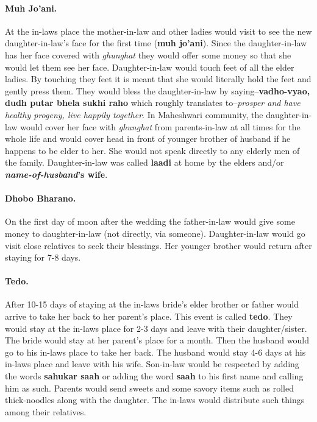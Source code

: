 \paragraph{Muh Jo'ani.} At the in-laws place the mother-in-law and other ladies
would visit to see the new daughter-in-law's face for the first time
(\textbf{muh jo'ani}). Since the daughter-in-law has her face covered with
\textit{ghunghat} they would offer some money so that she would let them see
her face. Daughter-in-law would touch feet of all the elder ladies. By touching
they feet it is meant that she would literally hold the feet and gently press
them. They would bless the daughter-in-law by saying--\textbf{vadho-vyao, dudh
putar bhela sukhi raho} which roughly translates to--\textit{prosper and
have healthy progeny, live happily together}. In Maheshwari community,
the daughter-in-law would cover her face with \textit{ghunghat} from
parents-in-law at all times for the whole life and would cover head in
front of younger brother of husband if he happens to be elder to her.
She would not speak directly to any elderly men of the family.
Daughter-in-law was called \textbf{laadi} at home by the elders and/or
\textbf{\emph{name-of-husband}'s wife}. 

\paragraph{Dhobo Bharano.} On the first day of moon after the wedding the
father-in-law would give some money to daughter-in-law (not directly, via
someone). Daughter-in-law would go visit close relatives to seek their
blessings. Her younger brother would return after staying for 7-8 days.

\paragraph{Tedo.} After 10-15 days of staying at the in-laws bride's elder
brother or father would arrive to take her back to her parent's place. This
event is called \textbf{tedo}. They would stay at the in-laws place for 2-3
days and leave with their daughter/sister. The bride would stay at her parent's
place for a month. Then the husband would go to his in-laws place to take her
back. The husband would stay 4-6 days at his in-laws place and leave with his
wife. Son-in-law would be respected by adding the words \textbf{sahukar saah}
or adding the word \textbf{saah} to his first name and calling him as such.
Parents would send sweets and some savory items such as rolled thick-noodles
along with the daughter. The in-laws would distribute such things among their
relatives. 

